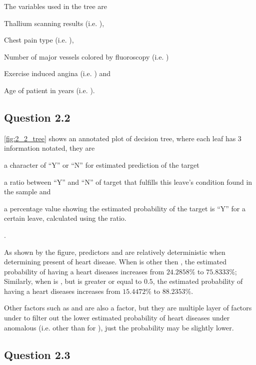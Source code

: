 \documentclass[parskip=full]{scrartcl}
\begin{document}
    The variables used in the tree are
    \begin{inparaenum}[(1)]
        \item Thallium scanning results (i.e. ),
        \item Chest pain type (i.e. ),
        \item Number of major vessels colored by fluoroscopy (i.e. )
        \item Exercise induced angina (i.e. ) and
        \item Age of patient in years (i.e. ).
    \end{inparaenum}

    \subsection*{Question 2.2}
    
    \autoref{fig:2_2_tree} shows an annotated plot of decision tree, where each leaf has 3 information notated, they are
    \begin{inparaenum}[(1)]
        \item a character of ``Y'' or ``N'' for estimated prediction of the target
        \item a ratio between ``Y'' and ``N'' of target that fulfills this leave's condition found in the sample and
        \item a percentage value showing the estimated probability of the target is ``Y'' for a certain leave, calculated using the ratio.
    \end{inparaenum}.

    As shown by the figure, predictors  and  are relatively deterministic when determining present of heart disease. When  is other then , the estimated probability of having a heart diseases increases from $24.2858\%$ to $75.8333\%$; Similarly, when  is , but  is greater or equal to $0.5$, the estimated probability of having a heart diseases increases from $15.4472\%$ to $88.2353\%$.
    
    Other factors such as  and  are also a factor, but they are multiple layer of factors under to filter out the lower estimated probability of heart diseases under anomalous  (i.e. other than  for ), just the probability may be slightly lower.
    
    \subsection*{Question 2.3}
    
\end{document}
